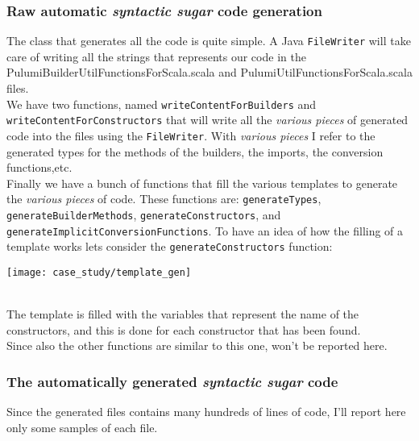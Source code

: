 \subsubsection{Raw automatic \textit{syntactic sugar} code generation}
The class that generates all the code is quite simple.
A Java \texttt{FileWriter} will take care of writing all the strings that represents our code in the PulumiBuilderUtilFunctionsForScala.scala and PulumiUtilFunctionsForScala.scala files.\\
We have two functions, named \texttt{writeContentForBuilders} and \texttt{writeContentForConstructors} that will write all the \textit{various pieces} of generated code into the files using the \texttt{FileWriter}.
With \textit{various pieces} I refer to the generated types for the methods of the builders, the imports, the conversion functions,etc.\\
Finally we have a bunch of functions that fill the various templates to generate the \textit{various pieces} of code.
These functions are: \texttt{generateTypes}, \texttt{generateBuilderMethods}, \texttt{generateConstructors}, and \texttt{generateImplicitConversionFunctions}.
To have an idea of how the filling of a template works lets consider the \texttt{generateConstructors} function:
\begin{center}
  \texttt{[image: case\_study/template\_gen]} 
\end{center}\mbox{}\\
The template is filled with the variables that represent the name of the constructors, and this is done for each constructor that has been found.\\
Since also the other functions are similar to this one, won't be reported here.

\subsubsection{The automatically generated \textit{syntactic sugar} code}
Since the generated files contains many hundreds of lines of code, I'll report here only some samples of each file.\\


